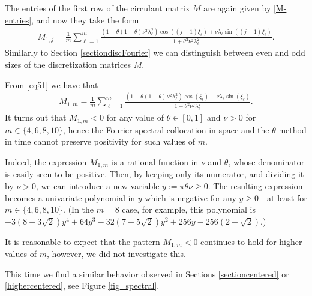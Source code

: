 \documentclass[a4paper]{article}
\begin{document}
The entries of the first row of the circulant matrix $M$ are again given by \eqref{M-entries}, and now %
they take the form
\begin{align}\label{eq51}
	M_{1,j}  = \frac{1}{m} \sum_{\ell=1}^{m} \frac{\left(1-\theta(1-\theta)\nu^2\lambda_\ell^2\right)
  \cos((j-1)\xi_\ell) + \nu\lambda_\ell\sin((j-1)\xi_\ell)}{1+\theta^2\nu^2\lambda_\ell^2}.
\end{align}
Similarly to Section \ref{sectiondiscFourier} we can distinguish between even and odd sizes of the discretization
matrices $M$.\\

\begin{description}[style=unboxed,leftmargin=0cm]
\item [{Case 1:} $m$ is {even}.]
From \eqref{eq51} we have that 
\begin{align*}
  M_{1,m} = \frac{1}{m} \sum_{\ell=1}^{m} \frac{\left(1-\theta(1-\theta)\nu^2\lambda_\ell^2\right)
  \cos(\xi_\ell) - \nu\lambda_\ell\sin(\xi_\ell)}{1+\theta^2\nu^2\lambda_\ell^2}.
\end{align*}
It turns out that $M_{1,m} <0$ for any value of $\theta\in[0,1]$ and $\nu>0$ for $m\in\{4,6,8,10\}$, hence the Fourier spectral collocation in space and the 
$\theta$-method in time cannot preserve positivity for such values of $m$. 

Indeed, the expression $M_{1,m}$ is a rational function in $\nu$ and $\theta$, whose denominator is easily seen to be positive. Then, by keeping only its numerator, and dividing it by $\nu>0$, we can introduce a new variable $y:=\pi\theta\nu\ge 0$. The resulting expression becomes a univariate polynomial in $y$ which is negative for any $y\ge 0$---at least for $m\in\{4,6,8,10\}$. (In the $m=8$ case, for example, this polynomial is
$-3 \left(8+3 \sqrt{2}\right) y^4+64 y^3-32 \left(7+5 \sqrt{2}\right) y^2+256 y-256 \left(2+\sqrt{2}\right)$.)

It is reasonable to expect that the pattern $M_{1,m} <0$ continues to hold for higher values of $m$, however, we did not investigate this.\\

\item [{Case 2:} $m$ is {odd}.]
This time we find a similar behavior observed in Sections \ref{sectioncentered} or \ref{highercentered}, see Figure \ref{fig_spectral}.
\end{description}
\end{document}
